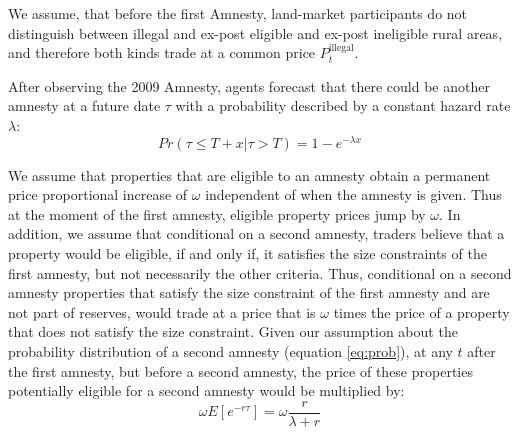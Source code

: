 \documentclass[12pt]{article}
\newcommand{\JS}[1]{{\color{red}{#1}}}
\newcommand{\PTR}[1]{{\color{blue}{#1}}}
\begin{document}
\quad %
We assume, that before the first Amnesty, land-market participants do not distinguish between illegal and ex-post eligible and ex-post ineligible rural areas,  and therefore both kinds trade at a common price $P_t^{\text{illegal}}$.
 

\quad After observing the 2009 Amnesty, agents forecast that there could be another amnesty at a future date $\tau$ with a probability described by   a constant hazard rate $\lambda$:
\begin{equation}
Pr(\tau\le T+x|\tau >T)= 1-e^{-\lambda x}    \label{eq:prob}
\end{equation}




We assume that properties that are eligible to an amnesty obtain a permanent price proportional increase of $\omega$ independent of when the amnesty is given.  Thus at the moment of the first amnesty, eligible property prices jump by $\omega.$ In addition, we assume that conditional on a second amnesty, traders believe that a property would be eligible, if and only if, it satisfies the size constraints of the first amnesty, but not necessarily the other criteria. Thus, conditional on a second amnesty properties that satisfy the size constraint of the first amnesty and are not part of reserves, would trade  at a price that is $\omega$ times the price of a property that does not satisfy the size constraint. Given our assumption about the probability distribution of a second amnesty (equation \ref{eq:prob}), at any $t$ after the first amnesty, but before a second amnesty, the price of these properties potentially eligible for a second  amnesty would  be multiplied  by:
$$\omega E\left [e^{-r\tau}\right ]= \omega \frac{r}{\lambda + r}$$
 
\JS{I am not sure we need anything else until we get to the empirical design}
\end{document}
